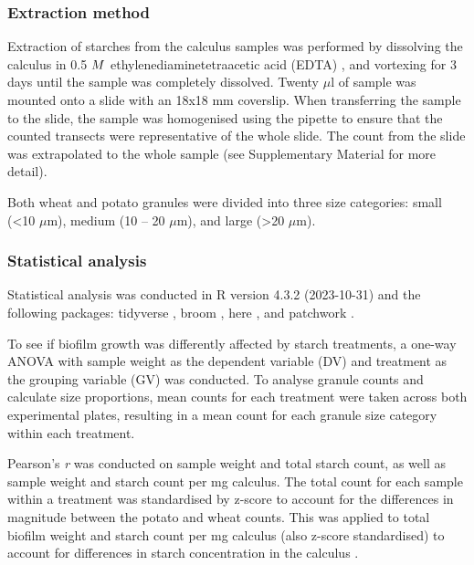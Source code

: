 \documentclass[utf8]{../templates/frontiersSCNS}
\begin{document}
\subsubsection{Extraction method}\label{extraction-method}

Extraction of starches from the calculus samples was performed by dissolving the
calculus in 0.5 \(\tiny{M}\) ethylenediaminetetraacetic acid (EDTA)
\citep{trompEDTACalculus2017, lemoyneCalculusPretreatments2021, modiCalculusMethodologies2020},
and vortexing for 3 days until the sample was completely dissolved.
Twenty \(\mu\)l of sample was mounted onto a slide with an 18x18 mm coverslip.
When transferring the sample to the slide, the sample was homogenised using
the pipette to ensure that the counted transects were representative of the
whole slide. The count from the slide was extrapolated to the whole sample
(see Supplementary Material for more detail).

Both wheat and potato granules were divided into three size categories:
small (\textless10 \(\mu\)m), medium (10 -- 20 \(\mu\)m), and large (\textgreater20 \(\mu\)m).

\subsubsection{Statistical analysis}\label{statistical-analysis}

Statistical analysis was conducted in R version 4.3.2 (2023-10-31) \citep{Rbase} and
the following packages: tidyverse \citep{tidyverse2019}, broom \citep{Rbroom},
here \citep{Rhere}, and patchwork \citep{Rpatchwork}.

To see if biofilm growth was differently affected by starch treatments, a
one-way ANOVA with sample weight as the dependent variable (DV) and treatment
as the grouping variable (GV) was conducted.
To analyse granule counts and calculate size proportions, mean counts for each
treatment were taken across
both experimental plates, resulting in a mean count for each
granule size category within each treatment.

Pearson's \emph{r} was conducted on sample weight and total starch count, as well as sample
weight and starch count per mg calculus. The total count for each sample within a
treatment was standardised by z-score to account for the differences in magnitude
between the potato and wheat counts.
This was applied to total biofilm weight and starch count per mg
calculus (also z-score standardised) to account for differences in starch
concentration in the calculus \citep[as per][]{wesolowskiEvaluatingMicrofossil2010}.
\end{document}

